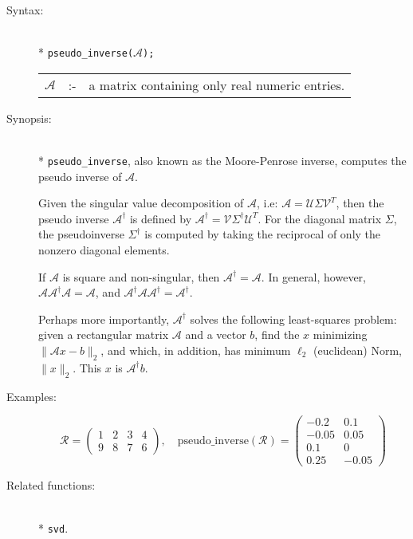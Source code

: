 \begin{description}
\item[Syntax:]\mbox{}\\*
\texttt{pseudo\_inverse($\mathcal{A}$);}\\[2mm]
\begin{tabular}{l l l}
$\mathcal{A}$ &:-& a matrix containing only real numeric entries.
\end{tabular}

\item[Synopsis:]\mbox{}\\*
\texttt{pseudo\_inverse}, also known as the Moore-Penrose inverse, computes
the pseudo inverse of $\mathcal{A}$.

Given the singular value decomposition of $\mathcal{A}$, i.e: $\mathcal{A} =
\mathcal{U}
\Sigma\mathcal{V}^T$, then the pseudo inverse $\mathcal{A}^{\dagger}$ is defined
by $\mathcal{A}^{\dagger} = \mathcal{V} \Sigma^{\dagger} \mathcal{U}^{T}$. For the
diagonal
matrix $\Sigma$, the pseudoinverse $\Sigma^{\dagger}$ is computed by taking the reciprocal
of only the nonzero diagonal elements.

If $\mathcal{A}$ is square and non-singular, then $\mathcal{A}^{\dagger} = \mathcal{A}$.
In general, however,
$\mathcal{A} \mathcal{A}^{\dagger} \mathcal{A} = \mathcal{A}$, and
$\mathcal{A}^{\dagger} \mathcal{A} \mathcal{A}^{\dagger} = \mathcal{A}^{\dagger}$.

Perhaps more importantly, $\mathcal{A}^{\dagger}$ solves the following least-squares
problem: given a rectangular matrix $\mathcal{A}$ and a vector $b$, find the
$x$ minimizing $\|\mathcal{A}x - b\|_2$,
and which, in addition, has minimum $\ell_{2}$ (euclidean) Norm, $\|x\|_2$.
This $x$ is $\mathcal{A}^{\dagger} b$.

\item[Examples:]
\begin{flushleft}
\[
\mathcal{R} = \begin{pmatrix} 1 & 2 & 3 & 4 \\ 9 & 8 & 7 & 6 \end{pmatrix},
\quad
\text{pseudo\_inverse}(\mathcal{R}) =
        \begin{pmatrix} -0.2 & 0.1 \\ -0.05 & 0.05 \\ 0.1 & 0 \\ 0.25 & -0.05 \end{pmatrix}
\]
\end{flushleft}

\item[Related functions:]\mbox{}\\*
\texttt{svd}.
\end{description}

